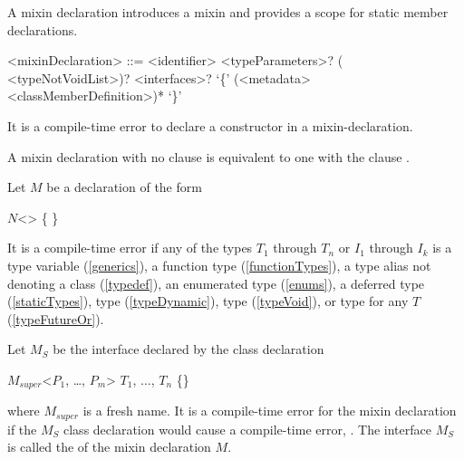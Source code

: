\documentclass[makeidx]{article}
\begin{document}
\LMHash{}%
A mixin declaration introduces a mixin and provides a scope
for static member declarations.

\begin{grammar}
<mixinDeclaration> ::= \MIXIN{} <identifier> <typeParameters>?
  \gnewline{} (\ON{} <typeNotVoidList>)? <interfaces>?
  \gnewline{} `\{' (<metadata> <classMemberDefinition>)* `\}'
\end{grammar}

\LMHash{}
It is a compile-time error to declare a constructor in a mixin-declaration.

\LMHash{}
A mixin declaration with no \code{\ON{}} clause is equivalent
to one with the clause .

\LMHash{}
Let $M$ be a \MIXIN{} declaration of the form

\begin{normativeDartCode}
\MIXIN{} $N$<\TypeParametersStd> \ON{} 
    \IMPLEMENTS{}  \{
\}
\end{normativeDartCode}

It is a compile-time error if any of the types $T_1$ through $T_n$
or $I_1$ through $I_k$ is
a type variable (\ref{generics}),
a function type (\ref{functionTypes}),
a type alias not denoting a class (\ref{typedef}),
an enumerated type (\ref{enums}),
a deferred type (\ref{staticTypes}),
type \DYNAMIC{} (\ref{typeDynamic}),
type \VOID{} (\ref{typeVoid}),
or type  for any $T$ (\ref{typeFutureOr}).

\LMHash{}%
Let $M_S$ be the interface declared by the class declaration

\begin{normativeDartCode}
\ABSTRACT{} \CLASS{} $M_{super}$<$P_1$, \ldots{}, $P_m$> \IMPLEMENTS{} $T_1$, $\dots{}$, $T_n$ \{\}
\end{normativeDartCode}

where $M_{super}$ is a fresh name.
It is a compile-time error for the mixin declaration if the $M_S$
class declaration would cause a compile-time error,
.
The interface $M_S$ is called the
 of the mixin declaration $M$.
\end{document}
